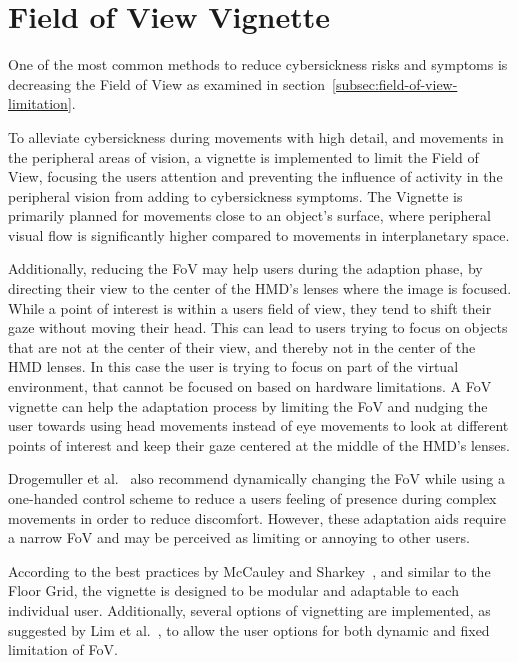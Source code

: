 \section{Field of View Vignette}\label{sec:field-of-view-vignette}

One of the most common methods to reduce cybersickness risks and symptoms is decreasing the Field of
View as examined in section~\ref{subsec:field-of-view-limitation}.

To alleviate cybersickness during movements with high detail, and movements in the peripheral areas of vision, a
vignette is implemented to limit the Field of View, focusing the users attention and preventing the influence of
activity in the peripheral vision from adding to cybersickness symptoms.
The Vignette is primarily planned for movements close to an object's surface, where peripheral visual flow is
significantly higher compared to movements in interplanetary space.

Additionally, reducing the FoV may help users during the adaption phase, by directing their view to the center of the
HMD's lenses where the image is focused.
While a point of interest is within a users field of view, they tend to shift their gaze without moving their head.
This can lead to users trying to focus on objects that are not at the center of their view, and thereby not in the
center of the HMD lenses.
In this case the user is trying to focus on part of the virtual environment, that cannot be focused on based on
hardware limitations.
A FoV vignette can help the adaptation process by limiting the FoV and nudging the user towards using head movements
instead of eye movements to look at different points of interest and keep their gaze centered at the middle of the
HMD's lenses.

Drogemuller et al.~\cite{Drogemuller2020} also recommend dynamically changing the FoV while using a one-handed
control scheme to reduce a users feeling of presence during complex movements in order to reduce discomfort.
However, these adaptation aids require a narrow FoV and may be perceived as limiting or annoying to other users.

According to the best practices by McCauley and Sharkey~\cite{McCauley1992}, and similar to the Floor Grid, the
vignette is designed to be modular and adaptable to each individual user.
Additionally, several options of vignetting are implemented, as suggested by Lim et al.~\cite{Lim2020}, to allow the
user options for both dynamic and fixed limitation of FoV\@.



